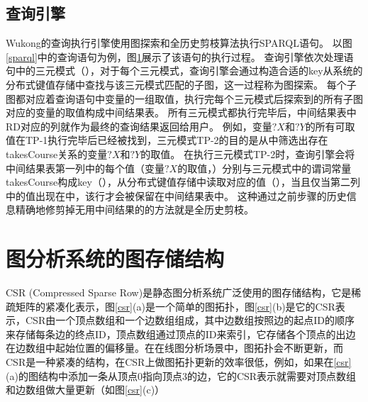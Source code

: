 \subsection{查询引擎}
\label{chap:engine}
Wukong的查询执行引擎使用图探索和全历史剪枝算法执行SPARQL语句。
以图\ref{sparql}中的查询语句为例，图\ref{engine}展示了该语句的执行过程。
查询引擎依次处理语句中的三元模式（），对于每个三元模式，查询引擎会通过构造合适的key从系统的分布式键值存储中查找与该三元模式匹配的子图，这一过程称为图探索。
每个子图都对应着查询语句中变量的一组取值，执行完每个三元模式后探索到的所有子图对应的变量的取值构成中间结果表。
所有三元模式都执行完毕后，中间结果表中RD对应的列就作为最终的查询结果返回给用户。
例如，变量$?X$和$?Y$的所有可取值在TP-1执行完毕后已经被找到，三元模式TP-2的目的是从中筛选出存在takesCourse关系的变量$?X$和$?Y$的取值。
在执行三元模式TP-2时，查询引擎会将中间结果表第一列中的每个值（变量$?X$的取值，）分别与三元模式中的谓词常量takesCourse构成key（），从分布式键值存储中读取对应的值（），当且仅当第二列中的值出现在中，该行才会被保留在中间结果表中。
这种通过之前步骤的历史信息精确地修剪掉无用中间结果的的方法就是全历史剪枝。

\begin{figure}[htb]
\label{engine}
\end{figure}

\section{图分析系统的图存储结构}
CSR (Compressed Sparse Row)是静态图分析系统广泛使用的图存储结构，它是稀疏矩阵的紧凑化表示，图\ref{csr}(a)是一个简单的图拓扑，图\ref{csr}(b)是它的CSR表示，CSR由一个顶点数组和一个边数组组成，其中边数组按照边的起点ID的顺序来存储每条边的终点ID，顶点数组通过顶点的ID来索引，它存储各个顶点的出边在边数组中起始位置的偏移量。在在线图分析场景中，图拓扑会不断更新，而CSR是一种紧凑的结构，在CSR上做图拓扑更新的效率很低，例如，如果在\ref{csr}(a)的图结构中添加一条从顶点0指向顶点3的边，它的CSR表示就需要对顶点数组和边数组做大量更新（如图\ref{csr}(c)）

